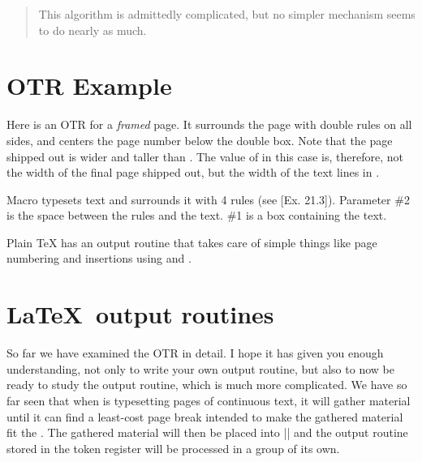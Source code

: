 \begin{quote}
  This  algorithm  is  admittedly  complicated, 
but  no  simpler  mechanism  seems  to  do  nearly 
as  much.
\end{quote}

\section{OTR Example}

\begin{comment}
\begin{figure}%
 \centering
  \texttt{[image: ./graphics/framedpage.jpg]}
  \caption{A boxed page}
  \label{fig:framedpage}
\end{figure}
\end{comment}

Here is an OTR for a \textit{framed} page. It surrounds the
page with double rules on all sides, and centers the
page number below the double box. Note that the
page shipped out is wider and taller than .
The value of  in this case is, therefore, not
the width of the final page shipped out, but the
width of the text lines in .

Macro  typesets text and surrounds it
with 4 rules (see [Ex. 21.3]). Parameter \#2 is the
space between the rules and the text. \#1 is a box
containing the text.



Plain TeX has an output routine that takes care of  simple things like page numbering and insertions
using  and . 

\section{\LaTeX\  output routines}

So far we have examined the \tex OTR in detail. I hope it has given you enough understanding, not only to write your own output routine, but also to now be ready to study the \latex output routine, which is much more complicated. We have so far seen that  when \tex 
is typesetting pages of continuous text, it will gather material until it can find a least-cost page break intended to
make the gathered material fit the . The
gathered material will then be placed into || and
the output routine stored in the token register 
will be processed in a group of its own. 

